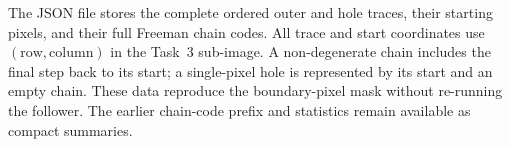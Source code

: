 The JSON file  stores the complete
ordered outer and hole traces, their starting pixels, and their full Freeman
chain codes.  All trace and start coordinates use $(\mathrm{row},
\mathrm{column})$ in the Task~3 sub-image.  A non-degenerate chain includes
the final step back to its start; a single-pixel hole is represented by its
start and an empty chain.  These data reproduce the boundary-pixel mask
without re-running the follower.  The earlier chain-code prefix and
statistics remain available as compact summaries.

\FloatBarrier
